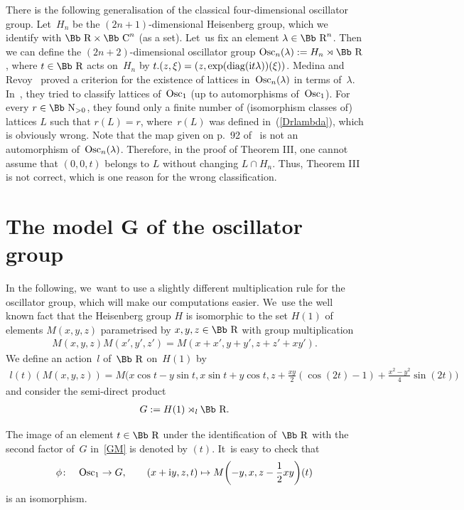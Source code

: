\documentclass[10pt,a4paper]{amsart}
\newcommand\CC{{\mbox{\Bb C}}}
\newcommand\RR{{\mbox{\Bb R}}}
\newcommand\NN{{\mbox{\Bb N}}}
\newcommand{\Osc}{{\rm Osc}}
\newcommand{\diag}{\mathop{{\rm diag}}}
\numberwithin{equation}{section}
\begin{document}
\begin{Remark}\label{RMR}
There is the following generalisation of the classical four-dimensional oscillator group. Let~$H_n$ be the $(2n+1)$-dimensional Heisenberg group, which we identify with $\RR\times \CC^n$ (as a set). Let~us fix an element $\lambda\in\RR^n$. Then we can define the $(2n+2)$-dimensional oscillator group $\Osc_n(\lambda):=H_n\rtimes\RR$, where $t\in\RR$ acts on~$H_n$ by $t.(z,\xi)=(z,\exp(\diag({\rm i}t\lambda))(\xi))$. Medina and Revoy~\cite{MR} proved a criterion for the existence of lattices in~$\Osc_n(\lambda)$ in terms of~$\lambda$. In~\cite[p.~94]{MR}, they tried to classify lattices of~$\Osc_1$ (up to automorphisms of~$\Osc_1$). For every $r\in\NN_{>0}$, they found only a finite number of (isomorphism classes of) lattices $L$ such that $r(L)=r$, where~$r(L)$ was defined in~(\ref{Drlambda}), which is obviously wrong. Note that the map given on p.~92 of~\cite{MR} is not an automorphism of~$\Osc_n(\lambda)$. Therefore, in the proof of Theorem III, one cannot assume that $(0,0,t)$ belongs to $L$ without changing $L\cap H_n$. Thus, Theorem III is not correct, which is one reason for the wrong classification.
\end{Remark}

\section[The model $G$ of the oscillator group]{The model $\boldsymbol G$ of the oscillator group}
In the following, we~want to use a slightly different multiplication rule for the oscillator group, which will make our computations easier. We~use the well known fact that the Heisenberg group $H$ is isomorphic to the set $H(1)$ of elements $M(x,y,z)$ parametrised by $x,y,z\in \RR$ with group multiplication
\begin{gather*}
M(x,y,z)M(x',y',z')=M(x+x',y+y',z+z'+xy').
\end{gather*}
We define an action~${l}$ of~$\RR$ on~$H(1)$ by
\begin{gather*}
l(t)(M(x,y,z))=M\bigg(x \cos t\! -y \sin t, x \sin t\! + y\cos t, z \!+ \frac {xy}2 (\cos (2t)\! -1)\!+\frac {x^2\!-y^2}4\sin (2t)\!\bigg)
\end{gather*}
and consider the semi-direct product
\begin{gather}
G:=H(1)\rtimes_l \RR. \label{GM}
\end{gather}
{\samepage
The image of an element $t\in\RR$ under the identification of~$\RR$ with the second factor of~$G$ in~\eqref{GM} is denoted by $(t)$. It~is easy to check that
\begin{gather}
\phi\colon\quad \Osc_1\rightarrow G,\qquad (x+{\rm i}y,z,t)\mapsto M\bigg({-}y,x,z-\frac12 xy\bigg)(t)\label{Eiso}
\end{gather}
is an isomorphism.

}
\end{document}
